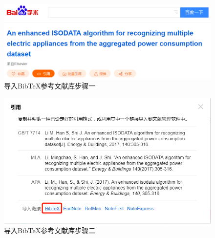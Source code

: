 \begin{figure}[tbh]
	\centering
	\includegraphics[width=0.6\linewidth]{figures/sample/3-1}
	\caption{导入BibTeX参考文献库步骤一}
	\label{fig:3-1}
\end{figure}

\begin{figure}[tbh]
	\centering
	\includegraphics[width=0.6\linewidth]{figures/sample/3-2}
	\caption{导入BibTeX参考文献库步骤二}
	\label{fig:3-2}
\end{figure}
